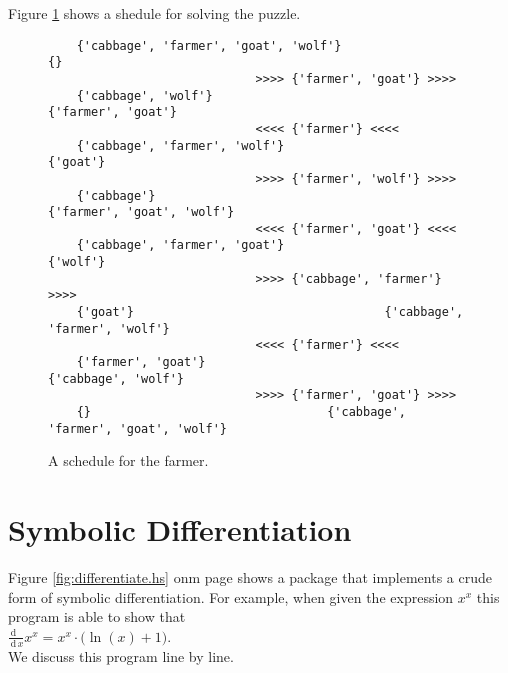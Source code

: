 Figure \ref{fig:wolf-ziege-solution} shows a shedule for solving the puzzle.




\begin{figure}[!ht]
  \centering
\begin{verbatim}
    {'cabbage', 'farmer', 'goat', 'wolf'}                                 {}
                             >>>> {'farmer', 'goat'} >>>> 
    {'cabbage', 'wolf'}                                   {'farmer', 'goat'}
                             <<<< {'farmer'} <<<< 
    {'cabbage', 'farmer', 'wolf'}                                   {'goat'}
                             >>>> {'farmer', 'wolf'} >>>> 
    {'cabbage'}                                   {'farmer', 'goat', 'wolf'}
                             <<<< {'farmer', 'goat'} <<<< 
    {'cabbage', 'farmer', 'goat'}                                   {'wolf'}
                             >>>> {'cabbage', 'farmer'} >>>> 
    {'goat'}                                   {'cabbage', 'farmer', 'wolf'}
                             <<<< {'farmer'} <<<< 
    {'farmer', 'goat'}                                   {'cabbage', 'wolf'}
                             >>>> {'farmer', 'goat'} >>>> 
    {}                                 {'cabbage', 'farmer', 'goat', 'wolf'}
\end{verbatim} 
\vspace*{-0.3cm}
\caption{A schedule for the farmer.}  
\label{fig:wolf-ziege-solution}
\end{figure}

\FloatBarrier

\section{Symbolic Differentiation}
Figure \ref{fig:differentiate.hs} onm page \pageref{fig:differentiate.hs}
shows a package that implements a crude form of symbolic differentiation.  For example, when given the
expression $x^x$ this program is able to show that 
\\[0.2cm]
\hspace*{1.3cm}
$\frac{\,\mathrm{d}\;\;\,}{\,\mathrm{d}\,x} x^x = x^x \cdot \bigl( \ln(x) + 1 \bigr)$.
\\[0.2cm]
We discuss this program line by line.

